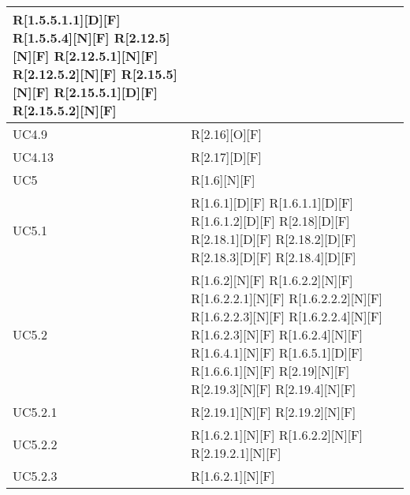 \begin{longtable}{X | X}
R[1.5.5.1.1][D][F] \newline
R[1.5.5.4][N][F] \newline
R[2.12.5][N][F] \newline
R[2.12.5.1][N][F] \newline
R[2.12.5.2][N][F] \newline
R[2.15.5][N][F] \newline
R[2.15.5.1][D][F] \newline
R[2.15.5.2][N][F]  \\
\hline
UC4.9 & R[2.16][O][F]  \\
\hline
UC4.13 & R[2.17][D][F]  \\
\hline
UC5 & R[1.6][N][F]  \\
\hline
UC5.1 & R[1.6.1][D][F] \newline
R[1.6.1.1][D][F] \newline
R[1.6.1.2][D][F] \newline
R[2.18][D][F] \newline
R[2.18.1][D][F] \newline
R[2.18.2][D][F] \newline
R[2.18.3][D][F] \newline
R[2.18.4][D][F]  \\
\hline
UC5.2 & R[1.6.2][N][F] \newline
R[1.6.2.2][N][F] \newline
R[1.6.2.2.1][N][F] \newline
R[1.6.2.2.2][N][F] \newline
R[1.6.2.2.3][N][F] \newline
R[1.6.2.2.4][N][F] \newline
R[1.6.2.3][N][F] \newline
R[1.6.2.4][N][F] \newline
R[1.6.4.1][N][F] \newline
R[1.6.5.1][D][F] \newline
R[1.6.6.1][N][F] \newline
R[2.19][N][F] \newline
R[2.19.3][N][F] \newline
R[2.19.4][N][F]  \\
\hline
UC5.2.1 & R[2.19.1][N][F] \newline
R[2.19.2][N][F]  \\
\hline
UC5.2.2 & R[1.6.2.1][N][F] \newline
R[1.6.2.2][N][F] \newline
R[2.19.2.1][N][F]  \\
\hline
UC5.2.3 & R[1.6.2.1][N][F] \newline

\end{longtable}
